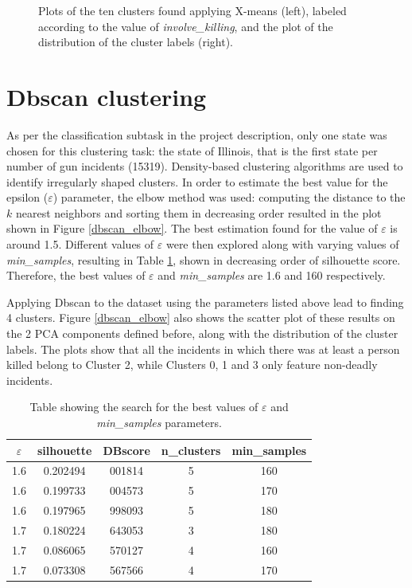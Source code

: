 \documentclass[10pt,a4paper]{report}
\begin{document}
\begin{figure}[h]
\begin{minipage}{0.25\textwidth}
		\vspace{0.8cm}
	\end{minipage}
		\caption{Plots of the ten clusters found applying X-means (left), labeled according to the value of \textit{involve\_killing}, and the plot of the distribution of the cluster labels (right).}
		\label{xmeans_killing}
\end{figure}

\section{Dbscan clustering}

As per the classification subtask in the project description, only one state was chosen for this clustering task: the state of Illinois, that is the first state per number of gun incidents (15319).
Density-based clustering algorithms are used to identify irregularly shaped clusters.
In order to estimate the best value for the epsilon ($\varepsilon$) parameter, the elbow method was used: computing the distance to the $k$ nearest neighbors and sorting them in decreasing order resulted in the plot shown in Figure \ref{dbscan_elbow}.
The best estimation found for the value of $\varepsilon$ is around 1.5.
Different values of $\varepsilon$ were then explored along with varying values of \textit{min\_samples}, resulting in Table \ref{table03}, shown in decreasing order of silhouette score.
Therefore, the best values of $\varepsilon$ and \textit{min\_samples} are 1.6 and 160 respectively.

Applying Dbscan to the dataset using the parameters listed above lead to finding 4 clusters.
Figure \ref{dbscan_elbow} also shows the scatter plot of these results on the 2 PCA components defined before, along with the distribution of the cluster labels.
The plots show that all the incidents in which there was at least a person killed belong to Cluster 2, while Clusters 0, 1 and 3 only feature non-deadly incidents.
\begin{table}[h]
	\centering
	\begin{small}
		\begin{tabular}{c|c|c|c|c}
			\textbf{$\varepsilon$} & \textbf{silhouette} & \textbf{DBscore} & \textbf{n\_clusters} & \textbf{min\_samples}\\
			\hline
			1.6 & 0.202494 & 001814 & 5 & 160\\
			1.6 & 0.199733 & 004573 & 5 & 170\\
			1.6 & 0.197965 & 998093 & 5 & 180\\
			1.7 & 0.180224 & 643053 & 3 & 180\\
			1.7 & 0.086065 & 570127 & 4 & 160\\
			1.7 & 0.073308 & 567566 & 4 & 170\\
	\end{tabular}
	\end{small}
	\caption{Table showing the search for the best values of $\varepsilon$ and \textit{min\_samples} parameters.}
	\label{table03}
\end{table}
\end{document}
